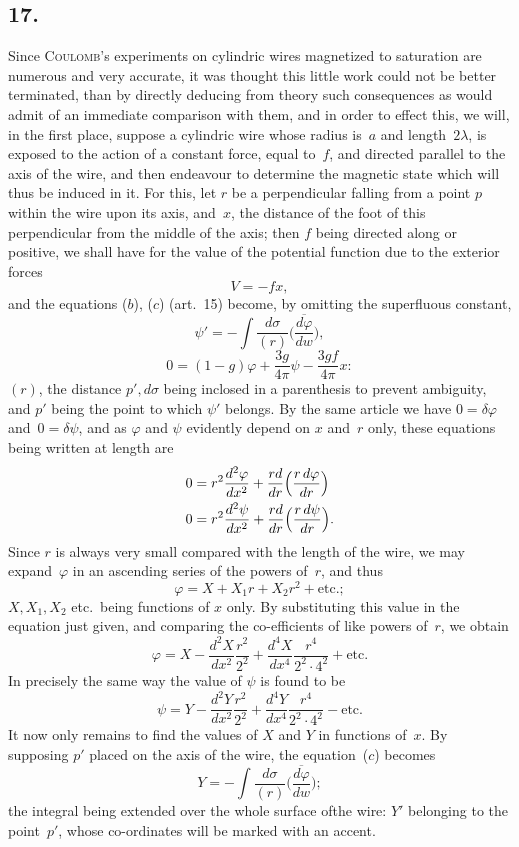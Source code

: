 \documentclass[12pt,notitlepage]{amsart}
\let\Person\textsc
\newcommand\Section[1]{\subsection{{#1}}}
\renewcommand{\phi}{\varphi}
\begin{document}
\Section{17.}
Since \Person{Coulomb}'s experiments on cylindric wires magnetized to saturation
are numerous and very accurate, it was thought this little work could not be
better terminated, than by directly deducing from theory such consequences
as would admit of an immediate comparison with them, and in order to effect
this, we will, in the first place, suppose a cylindric wire whose radius is~$a$
and length~$2\lambda$,
is exposed to the action of a constant force, equal to~$f$, and
directed parallel to the axis of the wire, and then endeavour to determine
the magnetic state which will thus be induced in it. For this, let $r$ be a
perpendicular falling from a point $p$ within the wire upon its axis, and~$x$,
the distance of the foot of this perpendicular from the middle of the axis;
then $f$ being directed along or positive, we shall have for the value of the
potential function due to the exterior forces
\[
V=-fx,
\]
and the equations ($b$), ($c$) (art.~15) become,
by omitting the superfluous constant,
\[
\tag{$b$}
\psi'=-\int\frac{d\sigma}{(r)}\biggl(\frac{\overline{d\phi}}{dw}\biggr),
\]
\[
\tag{$c$}
0=(1-g)\phi+\frac{3g}{4\pi}\psi-\frac{3gf}{4\pi}x:
\]
$(r)$, the distance $p',d\sigma$ being inclosed
in a parenthesis to prevent ambiguity,
and $p'$ being the point to which $\psi'$ belongs. By the same article we have
$0=\delta\phi$ and~$0=\delta\psi$,
and as $\phi$ and $\psi$ evidently depend on $x$ and~$r$ only,
these equations being written at length are
\[
\begin{aligned}
0 &= r^2\frac{d^2\phi}{dx^2}+\frac{rd}{dr}\Bigl(\frac{r\,d\phi}{dr}\Bigr)\\
0 &= r^2\frac{d^2\psi}{dx^2}+\frac{rd}{dr}\Bigl(\frac{r\,d\psi}{dr}\Bigr).
\end{aligned}
\]
Since $r$ is always very small compared with the length of the wire, we may
expand~$\phi$ in an ascending series of the powers of~$r$, and thus
\[
\phi=X+X_1r+X_2r^2+\text{etc.};
\]
$X,X_1,X_2$ etc.\ being functions of $x$ only. By substituting this value in
the equation just given, and comparing the co-efficients of like powers of~$r$,
we obtain
\[
\phi=X-\frac{d^2X}{dx^2}\frac{r^2}{2^2}
+\frac{d^4X}{dx^4}\frac{r^4}{2^2\cdot4^2}
+\text{etc.}
\]
In precisely the same way the value of $\psi$ is found to be
\[
\psi=Y-\frac{d^2Y}{dx^2}\frac{r^2}{2^2}
+\frac{d^4Y}{dx^4}\frac{r^4}{2^2\cdot4^2}
-\text{etc.}
\]
It now only remains to find the values of $X$ and $Y$ in functions of~$x$. By
supposing $p'$ placed on the axis of the wire, the equation~($c$) becomes
\[
Y=-\int\frac{d\sigma}{(r)}\biggl(\frac{\overline{d\phi}}{dw}\biggr);
\]
the integral being extended over the whole surface ofthe wire: $Y'$ belonging
to the point~$p'$, whose co-ordinates will be marked with an accent.
\end{document}
